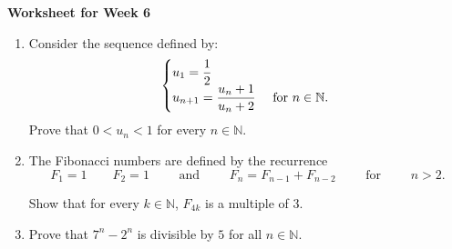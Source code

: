 \documentclass[12pt]{article}
\begin{document}
\centerline{\bf\large Worksheet for Week 6}

\vspace{25pt}


\begin{enumerate}

\item Consider the sequence defined by:
$$\begin{cases} u_1=\dfrac{1}{2}&\cr
u_{n+1}= \dfrac{u_n+1}{u_n+2}&\textrm{ for $n\in\mathbb N.$ }
\end{cases}$$
Prove that $0<u_n<1$ for every $n\in \mathbb N$.
%
%


\item     The Fibonacci numbers are defined by the recurrence
$$F_1 = 1 \qquad F_2 = 1 \qquad \text{ and }\qquad F_n = F_{n - 1} + F_{n - 2}\qquad \text{ for }\qquad n > 2.$$	


Show that for every $k \in \mathbb{N}$, $F_{4k}$ is a multiple of $3$.

%
%
%
%
%

\item Prove that $7^n-2^n$ is divisible by $5$ for all $n\in\mathbb N$.


\end{enumerate}
\end{document}

